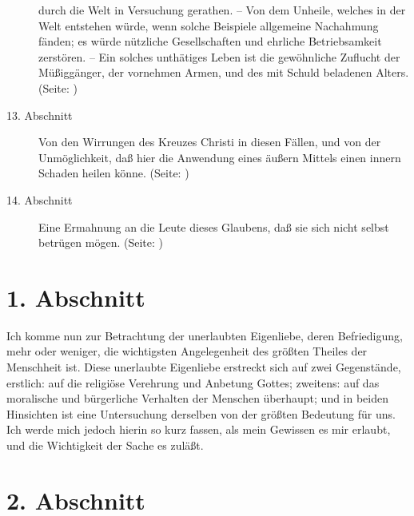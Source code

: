 \begin{description}
durch die Welt in Versuchung gerathen. -- Von dem Unheile, welches in der Welt
entstehen würde, wenn solche Beispiele allgemeine Nachahmung fänden; es würde
nützliche Gesellschaften und ehrliche Betriebsamkeit zerstören. -- Ein solches
unthätiges Leben ist die gewöhnliche Zuflucht der Müßiggänger, der vornehmen
Armen, und des mit Schuld beladenen Alters. (Seite: \pageref{kap5_ab12})
\item[13. Abschnitt] Von den Wirrungen des Kreuzes Christi in diesen Fällen, und
von der Unmöglichkeit, daß hier die Anwendung eines äußern Mittels einen innern
Schaden heilen könne. (Seite: \pageref{kap5_ab13})
\item[14. Abschnitt] Eine Ermahnung an die Leute dieses Glaubens, daß sie sich
nicht selbst betrügen mögen. (Seite: \pageref{kap5_ab14})

\end{description}
\normalsize

\section{1. Abschnitt} \label{kap5_ab1}

Ich komme nun zur Betrachtung der unerlaubten Eigenliebe, deren Befriedigung,
mehr oder weniger, die wichtigsten Angelegenheit des größten Theiles der
Menschheit ist. Diese unerlaubte Eigenliebe erstreckt sich auf zwei Gegenstände,
erstlich: auf die religiöse Verehrung und Anbetung Gottes; zweitens: auf das
moralische und bürgerliche Verhalten der Menschen überhaupt; und in beiden
Hinsichten ist eine Untersuchung derselben von der größten Bedeutung für uns.
Ich werde mich jedoch hierin so kurz fassen, als mein Gewissen es mir erlaubt,
und die Wichtigkeit der Sache es zuläßt.

\section{2. Abschnitt} \label{kap5_ab2}


